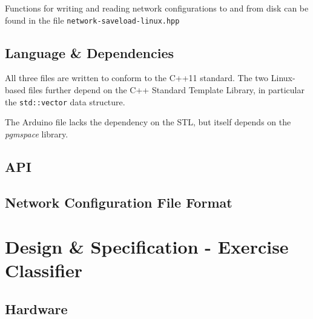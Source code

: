 \documentclass[a4paper]{article}
\begin{document}
Functions for writing and reading network configurations to and from disk can be found in the file \lstinline{network-saveload-linux.hpp}

\subsection{Language \& Dependencies}%

All three files are written to conform to the C++11 standard\cite{nnref0}. The two Linux-based files further depend on the C++ Standard Template Library, in particular the \lstinline{std::vector} data structure.

The Arduino file lacks the dependency on the STL, but itself depends on the \textit{pgmspace} library.\cite{nnref1}

\subsection{API}%


\subsection{Network Configuration File Format}%


\newpage
\section{Design \& Specification - Exercise Classifier}


\subsection{Hardware}%

\end{document}
